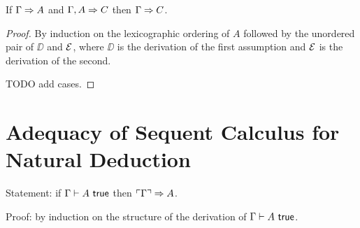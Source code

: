\documentclass{article}
\begin{document}
\begin{theorem}[Cut]
  If $\Gamma \Rightarrow A$ and $\Gamma, A \Rightarrow C$ then $\Gamma \Rightarrow C$.
\end{theorem}

\begin{proof}
  By induction on the lexicographic ordering of $A$ followed
  by the unordered pair of $\DD$ and $\mathcal{E}$, where $\DD$ is the derivation
  of the first assumption and $\mathcal{E}$ is the derivation of the second.

  TODO add cases.
\end{proof}

\section{Adequacy of Sequent Calculus for Natural Deduction}

Statement: if $\Gamma \vdash A\ \mathsf{true}$ then $\ulcorner \Gamma \urcorner
\Rightarrow A$.

Proof: by induction on the structure of the derivation of $\Gamma \vdash A
\ \mathsf{true}$.





\end{document}
